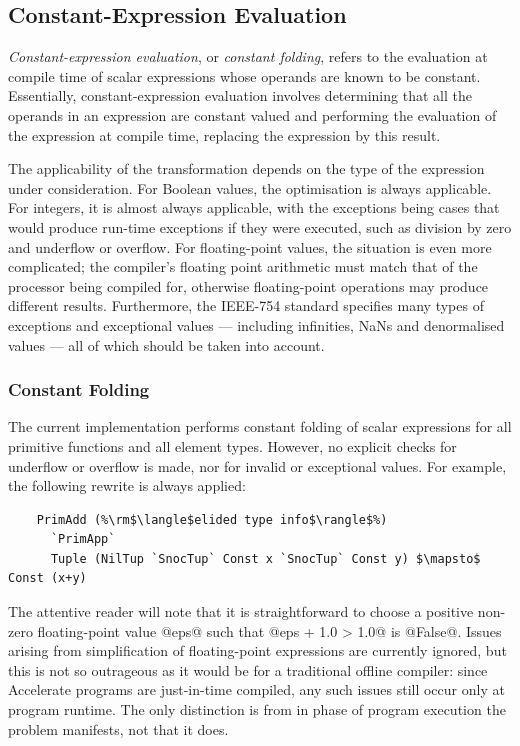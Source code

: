 \subsection{Constant-Expression Evaluation}

\emph{Constant-expression evaluation}, or \emph{constant folding}, refers to the
evaluation at compile time of scalar expressions whose operands are known to be
constant. Essentially, constant-expression evaluation involves determining that
all the operands in an expression are constant valued and performing the
evaluation of the expression at compile time, replacing the expression by this
result.

The applicability of the transformation depends on the type of the expression
under consideration. For Boolean values, the optimisation is always applicable.
For integers, it is almost always applicable, with the exceptions being cases
that would produce run-time exceptions if they were executed, such as division
by zero and underflow or overflow. For floating-point values, the situation is
even more complicated; the compiler's floating point arithmetic must match that
of the processor being compiled for, otherwise floating-point operations may
produce different results. Furthermore, the IEEE-754 standard specifies many
types of exceptions and exceptional values --- including infinities, NaNs and
denormalised values --- all of which should be taken into account.


\subsubsection{Constant Folding}

The current implementation performs constant folding of scalar expressions for
all primitive functions and all element types. However, no explicit checks for
underflow or overflow is made, nor for invalid or exceptional values. For
example, the following rewrite is always applied:
%
%
\begin{lstlisting}[style=Haskell,numbers=none,mathescape]
%\bf$\langle$ constant folding $\rangle$%
    PrimAdd (%\rm$\langle$elided type info$\rangle$%)
      `PrimApp`
      Tuple (NilTup `SnocTup` Const x `SnocTup` Const y) $\mapsto$ Const (x+y)
\end{lstlisting}
%
The attentive reader will note that it is straightforward to choose a positive
non-zero floating-point value @eps@ such that @eps + 1.0 > 1.0@ is
@False@. Issues arising from simplification of floating-point expressions
are currently ignored, but this is not so outrageous as it would be for a
traditional offline compiler: since Accelerate programs are just-in-time
compiled, any such issues still occur only at program runtime. The only
distinction is from in phase of program execution the problem manifests, not
that it does.

